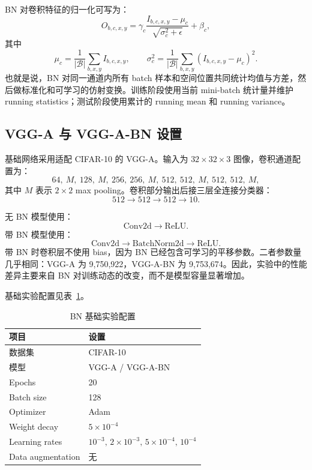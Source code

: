 \documentclass[UTF8,a4paper,11pt]{ctexart}
\begin{document}
BN 对卷积特征的归一化可写为：
\[
O_{b,c,x,y}
=
\gamma_c
\frac{I_{b,c,x,y}-\mu_c}{\sqrt{\sigma_c^2+\epsilon}}
+\beta_c,
\]
其中
\[
\mu_c=\frac{1}{|\mathcal B|}\sum_{b,x,y} I_{b,c,x,y},
\qquad
\sigma_c^2=\frac{1}{|\mathcal B|}\sum_{b,x,y}(I_{b,c,x,y}-\mu_c)^2.
\]
也就是说，BN 对同一通道内所有 batch 样本和空间位置共同统计均值与方差，然后做标准化和可学习的仿射变换。训练阶段使用当前 mini-batch 统计量并维护 running statistics；测试阶段使用累计的 running mean 和 running variance。

\subsection{VGG-A 与 VGG-A-BN 设置}

基础网络采用适配 CIFAR-10 的 VGG-A。输入为 $32\times32\times3$ 图像，卷积通道配置为：
\[
64,\ M,\ 128,\ M,\ 256,\ 256,\ M,\ 512,\ 512,\ M,\ 512,\ 512,\ M,
\]
其中 $M$ 表示 $2\times2$ max pooling。卷积部分输出后接三层全连接分类器：
\[
512 \rightarrow 512 \rightarrow 512 \rightarrow 10.
\]

无 BN 模型使用：
\[
\mathrm{Conv2d}\rightarrow \mathrm{ReLU}.
\]
带 BN 模型使用：
\[
\mathrm{Conv2d}\rightarrow \mathrm{BatchNorm2d}\rightarrow \mathrm{ReLU}.
\]
带 BN 时卷积层不使用 bias，因为 BN 已经包含可学习的平移参数。二者参数量几乎相同：VGG-A 为 9,750,922，VGG-A-BN 为 9,753,674。因此，实验中的性能差异主要来自 BN 对训练动态的改变，而不是模型容量显著增加。

基础实验配置见表~\ref{tab:bn_base_config}。

\begin{table}[H]
  \centering
  \caption{BN 基础实验配置}
  \label{tab:bn_base_config}
  \begin{tabular}{ll}
    \toprule
    项目 & 设置 \\
    \midrule
    数据集 & CIFAR-10 \\
    模型 & VGG-A / VGG-A-BN \\
    Epochs & 20 \\
    Batch size & 128 \\
    Optimizer & Adam \\
    Weight decay & $5\times10^{-4}$ \\
    Learning rates & $10^{-3},\,2\times10^{-3},\,5\times10^{-4},\,10^{-4}$ \\
    Data augmentation & 无 \\
    \bottomrule
  \end{tabular}
\end{table}
\end{document}
